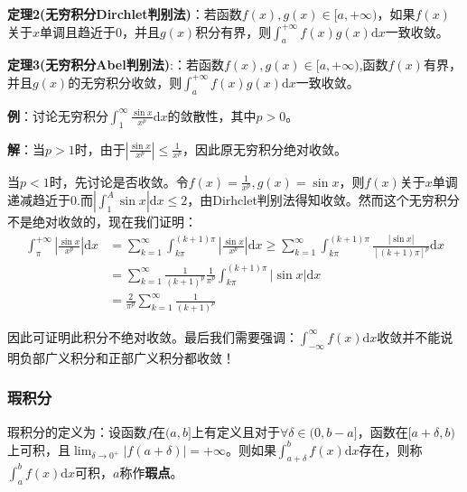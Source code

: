 \documentclass{ctexart}
\let\oldtextbf\textbf
\renewcommand{\textbf}[1]{\textcolor{brown!50!red}{\oldtextbf{#1}}}
\begin{document}
\begin{tcolorbox}[
    colback=bac2,     %
    colframe=fra2,   %
    coltitle=white,             %
    coltext=tex2,
    title=圆角框,
    fonttitle=\bfseries,        %
arc=3mm,                     %
breakable
]
\textbf{\color{brown!50!red}定理2(无穷积分Dirchlet判别法)}：若函数$f(x),g(x)\in[a,+\infty)$，如果$f(x)$关于$x$单调且趋近于0，并且$g(x)$积分有界，则$\int_a^{+\infty}f(x)g(x)\mathrm{d}x$一致收敛。
\end{tcolorbox}
\begin{tcolorbox}[
    colback=bac2,     %
    colframe=fra2,   %
    coltitle=white,             %
    coltext=tex2,
    title=圆角框,
    fonttitle=\bfseries,        %
arc=3mm,                     %
breakable
]

\textbf{\color{brown!50!red}定理3(无穷积分Abel判别法)}:：若函数$f(x),g(x)\in[a,+\infty)$,函数$f(x)$有界，并且$g(x)$的无穷积分收敛，则$\int_a^{+\infty}f(x)g(x)\mathrm{d}x$一致收敛。

\end{tcolorbox}


\textbf{\color{brown!50!red}例}：讨论无穷积分$\int_1^\infty \frac{\sin x}{x^p}\mathrm{d}x$的敛散性，其中$p>0$。

\textbf{\color{brown!50!red}解}：当$p>1$时，由于$|\frac{\sin x}{x^p}|\leq \frac{1}{x^p}$，因此原无穷积分绝对收敛。

当$p<1$时，先讨论是否收敛。令$f(x)=\frac{1}{x^p},g(x)=\sin x$，则$f(x)$关于$x$单调递减趋近于0.而$|\int_1^A \sin x|\mathrm{d}x\leq 2$，由Dirhclet判别法得知收敛。然而这个无穷积分不是绝对收敛的，现在我们证明：
\begin{align*} 
  \int_\pi^{+\infty}|\frac{\sin x}{x^p} |\mathrm{d}x&=\sum_{k=1}^\infty \int_{k\pi}^{(k+1)\pi}
|\frac{\sin x}{x^p} |\mathrm{d}x\geq\sum_{k=1}^\infty \int_{k\pi}^{(k+1)\pi}\frac{|\sin x|}{[(k+1)\pi]^p}\mathrm{d}x\\
&= \sum_{k=1}^\infty\frac{1}{(k+1)^p}\frac{1}{\pi^p}\int_{k\pi}^{(k+1)\pi}|\sin x|\mathrm{d}x\\
&=\frac{2}{\pi^p}\sum_{k=1}^\infty \frac{1}{(k+1)^p}   
\end{align*}

因此可证明此积分不绝对收敛。最后我们需要强调：$\int_{-\infty}^{\infty}f(x)\mathrm{d}x$收敛并不能说明负部广义积分和正部广义积分都收敛！

\subsubsection{瑕积分}
瑕积分的定义为：设函数$f$在$(a,b]$上有定义且对于$\forall \delta\in(0,b-a]$，函数在$[a+\delta,b)$上可积，且$\lim_{\delta\to 0^+}|f(a+\delta)|=+\infty$。则如果$\int_{a+\delta}^b f(x)\mathrm{d}x$存在，则称$\int_a^b f(x)\mathrm{d}x$可积，$a$称作\textbf{\color{brown!50!red}瑕点}。
\end{document}
